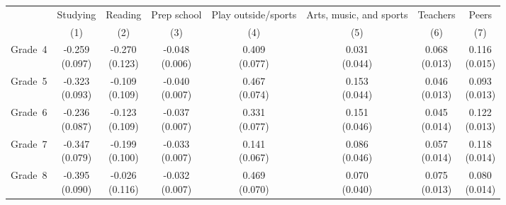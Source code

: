 \begin{tabular}{lccccccc}
\hline \hline 
 & Studying & Reading & Prep school & Play outside/sports & Arts, music, and sports & Teachers & Peers \\
 & (1) & (2) & (3) & (4) & (5) & (6) & (7) \\
\hline 
Grade~4 & \shortstack{-0.259\\(0.097)} & \shortstack{-0.270\\(0.123)} & \shortstack{-0.048\\(0.006)} & \shortstack{0.409\\(0.077)} & \shortstack{0.031\\(0.044)} & \shortstack{0.068\\(0.013)} & \shortstack{0.116\\(0.015)} \\
Grade~5 & \shortstack{-0.323\\(0.093)} & \shortstack{-0.109\\(0.109)} & \shortstack{-0.040\\(0.007)} & \shortstack{0.467\\(0.074)} & \shortstack{0.153\\(0.044)} & \shortstack{0.046\\(0.013)} & \shortstack{0.093\\(0.013)} \\
Grade~6 & \shortstack{-0.236\\(0.087)} & \shortstack{-0.123\\(0.109)} & \shortstack{-0.037\\(0.007)} & \shortstack{0.331\\(0.077)} & \shortstack{0.151\\(0.046)} & \shortstack{0.045\\(0.014)} & \shortstack{0.122\\(0.013)} \\
Grade~7 & \shortstack{-0.347\\(0.079)} & \shortstack{-0.199\\(0.100)} & \shortstack{-0.033\\(0.007)} & \shortstack{0.141\\(0.067)} & \shortstack{0.086\\(0.046)} & \shortstack{0.057\\(0.014)} & \shortstack{0.118\\(0.014)} \\
Grade~8 & \shortstack{-0.395\\(0.090)} & \shortstack{-0.026\\(0.116)} & \shortstack{-0.032\\(0.007)} & \shortstack{0.469\\(0.070)} & \shortstack{0.070\\(0.040)} & \shortstack{0.075\\(0.013)} & \shortstack{0.080\\(0.014)} \\

\end{tabular}

